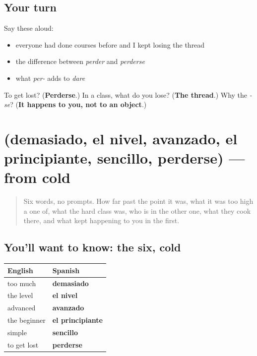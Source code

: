 \subsection*{Your turn}
Say these aloud:

\begin{itemize}
\raggedright
  \item everyone had done courses before and I kept losing the thread
  \item the difference between \emph{perder} and \emph{perderse}
  \item what \emph{per-} adds to \emph{dare}
\end{itemize}

\begin{tcolorbox}[breakable,colback=teal!4,colframe=teal!35!black,title={Before you move on}]
To get lost? (\textbf{Perderse}.) In a class, what do you lose? (\textbf{The thread}.) Why the \emph{-se}? (\textbf{It happens to you, not to an object}.)
\end{tcolorbox}
\section[(demasiado, el nivel, avanzado, el …]{(demasiado, el nivel, avanzado, el principiante, sencillo, perderse) — from cold}

\label{lesson:ES-R471-repaso-curso}



\begin{quote}
Six words, no prompts. How far past the point it was, what it was too high a one of, what the hard class was, who is in the other one, what they cook there, and what kept happening to you in the first.
\end{quote}

\subsection*{You'll want to know: the six, cold}
\noindent
\begin{tabularx}{\linewidth}{@{}>{\raggedright\arraybackslash}X>{\raggedright\arraybackslash}X@{}}
\toprule
\textbf{English} & \textbf{Spanish} \\
\midrule
too much & \textbf{demasiado} \\
the level & \textbf{el nivel} \\
advanced & \textbf{avanzado} \\
the beginner & \textbf{el principiante} \\
simple & \textbf{sencillo} \\
to get lost & \textbf{perderse} \\
\bottomrule
\end{tabularx}

